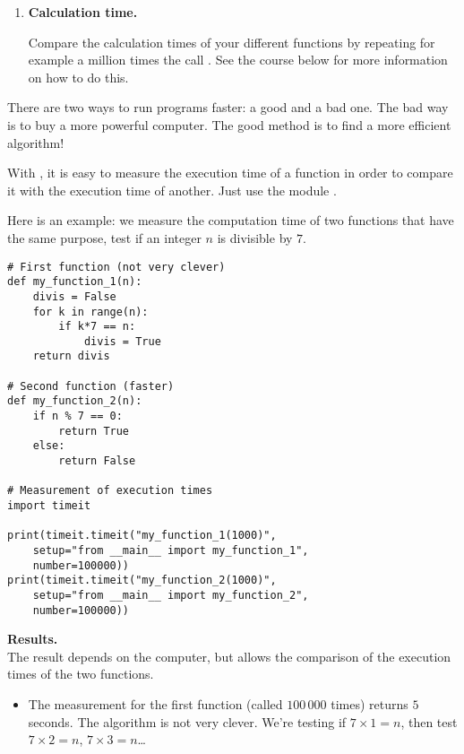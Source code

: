 \documentclass[11pt,class=report,crop=false]{standalone}
\begin{document}
\begin{activite}
\begin{enumerate}
  
  \item \textbf{Calculation time.}
  
  Compare the calculation times of your different functions  by repeating for example a million times the call . See the course below for more information on how to do this.
\end{enumerate}   
     
\end{activite}


\begin{cours}

There are two ways to run programs faster: a good and a bad one. The bad way is to buy a more powerful computer.
The good method is to find a more efficient algorithm!

With \Python, it is easy to measure the execution time of a function in order to compare it with the execution time of another. Just use the module .


Here is an example: we measure the computation time of two functions that have the same purpose, test if an integer $n$ is divisible by $7$.

\begin{lstlisting}  
# First function (not very clever)
def my_function_1(n):
    divis = False
    for k in range(n):
        if k*7 == n:
            divis = True
    return divis

# Second function (faster)
def my_function_2(n):
    if n % 7 == 0:
        return True
    else:
        return False

# Measurement of execution times
import timeit

print(timeit.timeit("my_function_1(1000)", 
    setup="from __main__ import my_function_1", 
    number=100000))
print(timeit.timeit("my_function_2(1000)", 
    setup="from __main__ import my_function_2", 
    number=100000))
\end{lstlisting} 


\textbf{Results.} \\
The result depends on the computer, but allows the comparison of the execution times of the two functions.
\begin{itemize}
  \item The measurement for the first function (called $100\,000$ times) returns $5$ seconds. The algorithm is not very clever. We're testing
  if $7\times 1 =n$, then test $7\times 2 = n$, $7\times 3 = n$\ldots
  

\end{itemize}
\end{cours}
\end{document}
